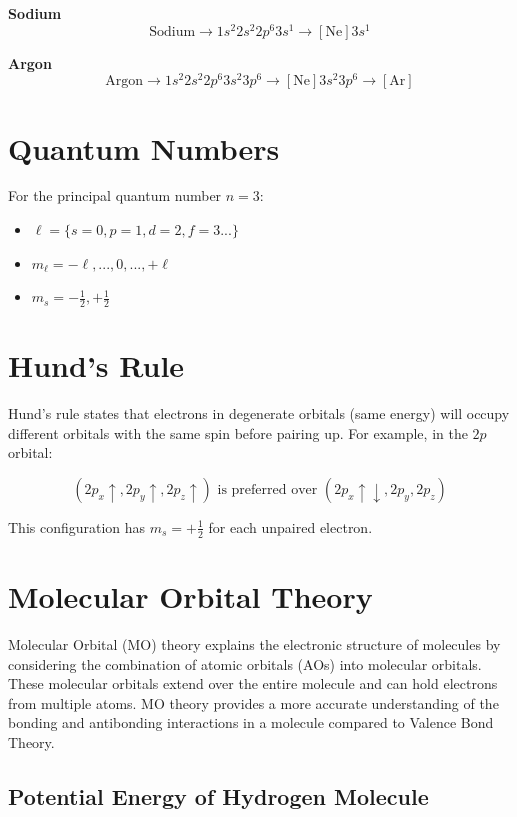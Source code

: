 \documentclass{report}
\begin{document}
\textbf{Sodium}
\[ \text{Sodium} \rightarrow 1s^2 2s^2 2p^6 3s^1 \rightarrow [\text{Ne}] 3s^1 \]

\textbf{Argon}
\[ \text{Argon} \rightarrow 1s^2 2s^2 2p^6 3s^2 3p^6 \rightarrow [\text{Ne}] 3s^2 3p^6 \rightarrow [\text{Ar}] \]

\section{Quantum Numbers}

For the principal quantum number $n = 3$:

\begin{itemize}
	\item $\ell = \{s=0, p=1, d=2, f=3...\}$
	\item $m_\ell = -\ell, ..., 0, ..., +\ell$
	\item $m_s = -\frac{1}{2}, +\frac{1}{2}$
\end{itemize}

\section{Hund's Rule}

Hund's rule states that electrons in degenerate orbitals (same energy) will occupy different orbitals with the same spin before pairing up. For example, in the $2p$ orbital:

\[ (2p_x \uparrow, 2p_y \uparrow, 2p_z \uparrow) \text{ is preferred over } (2p_x \uparrow\downarrow, 2p_y, 2p_z) \]

This configuration has $m_s = +\frac{1}{2}$ for each unpaired electron.

\section{Molecular Orbital Theory}

Molecular Orbital (MO) theory explains the electronic structure of molecules by considering the combination of atomic orbitals (AOs) into molecular orbitals. These molecular orbitals extend over the entire molecule and can hold electrons from multiple atoms. MO theory provides a more accurate understanding of the bonding and antibonding interactions in a molecule compared to Valence Bond Theory.

\subsection{Potential Energy of Hydrogen Molecule}
\end{document}
